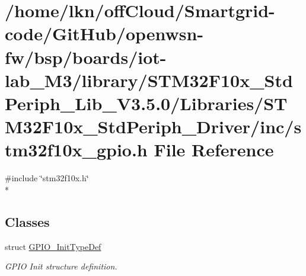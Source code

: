 \hypertarget{iot-lab___m3_2library_2_s_t_m32_f10x___std_periph___lib___v3_85_80_2_libraries_2_s_t_m32_f10x___17d85112475f5f0acecc020d01f1289e}{}\section{/home/lkn/off\+Cloud/\+Smartgrid-\/code/\+Git\+Hub/openwsn-\/fw/bsp/boards/iot-\/lab\+\_\+\+M3/library/\+S\+T\+M32\+F10x\+\_\+\+Std\+Periph\+\_\+\+Lib\+\_\+\+V3.5.0/\+Libraries/\+S\+T\+M32\+F10x\+\_\+\+Std\+Periph\+\_\+\+Driver/inc/stm32f10x\+\_\+gpio.h File Reference}
\label{iot-lab___m3_2library_2_s_t_m32_f10x___std_periph___lib___v3_85_80_2_libraries_2_s_t_m32_f10x___17d85112475f5f0acecc020d01f1289e}
{\ttfamily \#include \char`\"{}stm32f10x.\+h\char`\"{}}\\*
\subsection*{Classes}
\begin{DoxyCompactItemize}
\item 
struct \hyperlink{struct_g_p_i_o___init_type_def}{G\+P\+I\+O\+\_\+\+Init\+Type\+Def}
\begin{DoxyCompactList}\small\item\em G\+P\+IO Init structure definition. \end{DoxyCompactList}\end{DoxyCompactItemize}

